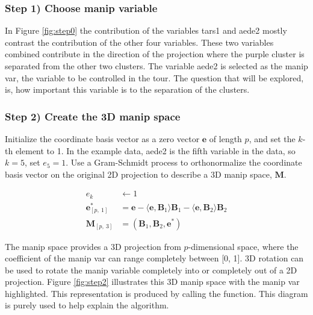 \hypertarget{step-1-choose-manip-variable}{%
\subsubsection{Step 1) Choose manip
variable}\label{step-1-choose-manip-variable}}

In Figure \ref{fig:step0} the contribution of the variables tars1 and
aede2 mostly contrast the contribution of the other four variables.
These two variables combined contribute in the direction of the
projection where the purple cluster is separated from the other two
clusters. The variable aede2 is selected as the manip var, the variable
to be controlled in the tour. The question that will be explored, is,
how important this variable is to the separation of the clusters.

\hypertarget{step-2-create-the-3d-manip-space}{%
\subsubsection{Step 2) Create the 3D manip
space}\label{step-2-create-the-3d-manip-space}}

Initialize the coordinate basis vector as a zero vector \(\textbf{e}\)
of length \(p\), and set the \(k\)-th element to 1. In the example data,
aede2 is the fifth variable in the data, so \(k=5\), set \(e_5=1\). Use
a Gram-Schmidt process to orthonormalize the coordinate basis vector on
the original 2D projection to describe a 3D manip space, \(\textbf{M}\).

\begin{align*}
  e_k &\leftarrow 1 \\ 
  \textbf{e}^*_{[p,~1]} &= \textbf{e} - \langle \textbf{e}, \textbf{B}_1 \rangle \textbf{B}_1 - \langle \textbf{e}, \textbf{B}_2 \rangle \textbf{B}_2 \\ 
  \textbf{M}_{[p,~3]} &= (\textbf{B}_1,\textbf{B}_2,\textbf{e}^*)
\end{align*}

The manip space provides a 3D projection from \(p\)-dimensional space,
where the coefficient of the manip var can range completely between
{[}0, 1{]}. 3D rotation can be used to rotate the manip variable
completely into or completely out of a 2D projection. Figure
\ref{fig:step2} illustrates this 3D manip space with the manip var
highlighted. This representation is produced by calling the
 function. This diagram is purely used to
help explain the algorithm.

